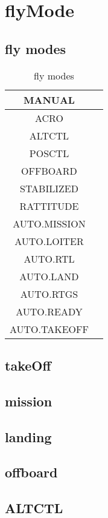 \chapter{flyMode}
\section{fly modes}
\begin{table}[h]
    \centering
    \caption{fly modes}\label{tab:tab2}
    \begin{tabular}{|c|c|}
    \hline
        MANUAL & \\\hline
        ACRO & \\\hline
        ALTCTL & \\\hline
        POSCTL & \\\hline
        OFFBOARD & \\\hline
        STABILIZED & \\\hline
        RATTITUDE  & \\\hline
        AUTO.MISSION & \\\hline
        AUTO.LOITER  & \\\hline
        AUTO.RTL  & \\\hline
        AUTO.LAND  & \\\hline
        AUTO.RTGS  & \\\hline
        AUTO.READY & \\\hline
        AUTO.TAKEOFF & \\\hline
    \end{tabular}
\end{table}
\clearpage
\section{takeOff}
\clearpage
\section{mission}
\clearpage
\section{landing}
\clearpage
\section{offboard}
\clearpage
\section{ALTCTL}

\clearpage